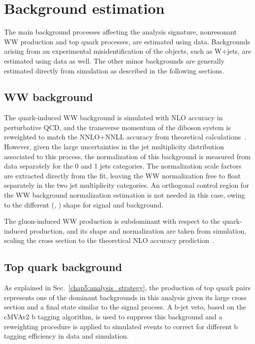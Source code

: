 \section{Background estimation}\label{chap5:backgrounds}

The main background processes affecting the analysis signature, nonresonant WW production and top quark processes, are estimated using data. Backgrounds arising from an experimental misidentification of the objects, such as W+jets, are estimated using data as well. The other minor backgrounds are generally estimated directly from simulation as described in the following sections.

\subsection{WW background}

The quark-induced WW background is simulated with NLO accuracy in perturbative QCD, and the transverse momentum of the diboson system is reweighted to match the NNLO+NNLL accuracy from theoretical calculations~\cite{Meade:2014fca,Jaiswal:2014yba}. However, given the large uncertainties in the jet multiplicity distribution associated to this process, the normalization of this background is measured from data separately for the 0 and 1 jets categories. The normalization scale factors are extracted directly from the fit, leaving the WW normalization free to float separately in the two jet multiplicity categories. An orthogonal control region for the WW background normalization estimation is not needed in this case, owing to the different (\mll, \mt) shape for signal and background.

The gluon-induced WW production is subdominant with respect to the quark-induced production, and its shape and normalization are taken from simulation, scaling the cross section to the theoretical NLO accuracy prediction~\cite{Caola:2015rqy}.

\subsection{Top quark background}

As explained in Sec.~\ref{chap5:analysis_strategy}, the production of top quark pairs represents one of the dominant backgrounds in this analysis given its large cross section and a final state similar to the signal process. A b-jet veto, based on the cMVAv2 b tagging algorithm, is used to suppress this background and a reweighting procedure is applied to simulated events to correct for different b tagging efficiency in data and simulation.

